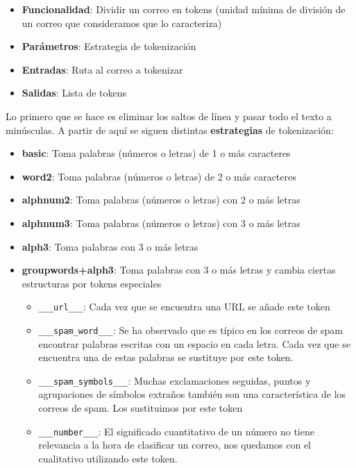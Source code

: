 \begin{itemize}
	\item \textbf{Funcionalidad}: Dividir un correo en tokens (unidad mínima
		de división de un correo que consideramos que lo caracteriza)
	\item \textbf{Parámetros}: Estrategia de tokenización
	\item \textbf{Entradas}: Ruta al correo a tokenizar
	\item \textbf{Salidas}: Lista de tokens
\end{itemize}

Lo primero que se hace es eliminar los saltos de línea y pasar todo el texto a
minúsculas. A partir de aquí se siguen distintas \textbf{estrategias} de
tokenización:

\begin{itemize}
	\item \textbf{basic}: Toma palabras (números o letras) de 1 o más caracteres
	\item \textbf{word2}: Toma palabras (números o letras) de 2 o más caracteres
	\item \textbf{alphnum2}: Toma palabras (números o letras) con 2 o más letras
	\item \textbf{alphnum3}: Toma palabras (números o letras) con 3 o más letras
	\item \textbf{alph3}: Toma palabras con 3 o más letras
	\item \textbf{groupwords+alph3}: Toma palabras con 3 o más letras y
		cambia ciertas estructuras por tokens especiales
	\begin{itemize}
		\item \texttt{\_\_\_url\_\_\_}: Cada vez que se encuentra una
			URL se añade este token
		\item \texttt{\_\_\_spam\_word\_\_\_}: Se ha observado que es
			típico en los correos de spam encontrar palabras
			escritas con un espacio en cada letra. Cada vez que se
			encuentra una de estas palabras se sustituye por este
			token.
		\item \texttt{\_\_\_spam\_symbols\_\_\_}: Muchas exclamaciones
			seguidas, puntos y agrupaciones de símbolos extraños
			también son una característica de los correos de spam.
			Los sustituimos por este token
		\item \texttt{\_\_\_number\_\_\_}: El significado cuantitativo
			de un número no tiene relevancia a la hora de clasificar
			un correo, nos quedamos con el cualitativo utilizando
			este token.
	\end{itemize}
\end{itemize}

